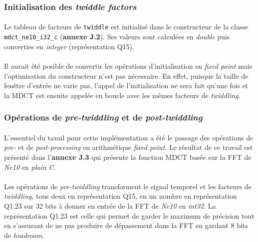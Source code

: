\documentclass{article}
\begin{document}
    \subsubsection{Initialisation des \emph{twiddle factors}}
    \paragraph{}
    Le tableau de facteurs de \texttt{twiddle} est initialisé dans le constructeur de la classe \texttt{mdct\_ne10\_i32\_c} (\textbf{annexe J.2}). Ses valeurs sont calculées en \emph{double} puis converties en \emph{integer} (représentation Q15).
    
    \paragraph{}
    Il aurait été posible de convertir les opérations d'initialisation en \emph{fixed point} mais l'optimisation du constructeur n'est pas nécessaire. En effet, puisque la taille de fenêtre d'entrée ne varie pas, l'appel de l'initialisation ne sera fait qu'une fois et la MDCT est ensuite appelée en boucle avec les mêmes facteurs de \emph{twiddling}.

    \subsubsection{Opérations de \emph{pre-twiddling} et de \emph{post-twiddling}}
    \paragraph{}
    L'essentiel du tavail pour cette implémentation a été le passage des opérations de \emph{pre-} et de \emph{post-processing} en arithmétique \emph{fixed point}. Le résultat de ce travail est présenté dans l'\textbf{annexe J.3} qui présente la fonction MDCT basée sur la FFT de \emph{Ne10} en \emph{plain C}.

    \paragraph{}
    Les opérations de \emph{pre-twiddling} transforment le signal temporel et les facteurs de \emph{twiddling}, tous deux en représentation Q15, en un nombre en représentation Q1.23 sur 32 bits à donner en entrée de la FFT de \emph{Ne10} en \emph{int32}. La représentation Q1.23 est celle qui permet de garder le maximum de précision tout en s'assurant de ne pas produire de dépassement dans la FFT en gardant 8 bits de \emph{headroom}.
\end{document}
